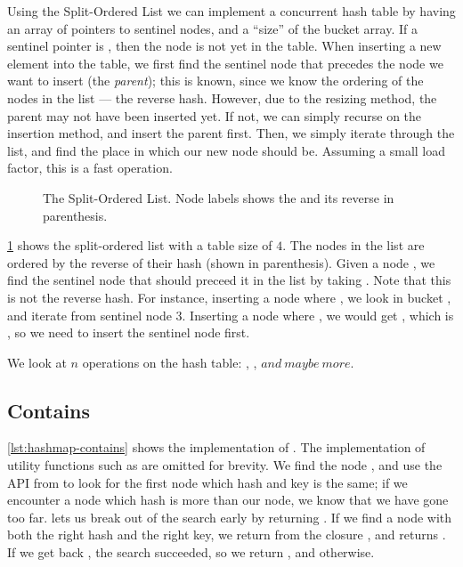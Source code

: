 Using the Split-Ordered List we can implement a concurrent hash table by having an array of
pointers to sentinel nodes, and a ``size'' of the bucket array. If a sentinel pointer is
, then the node is not yet in the table. When inserting a new element into the table, we
first find the sentinel node that precedes the node we want to insert (the \emph{parent}); this is
known, since we know the ordering of the nodes in the list --- the reverse hash. However, due to
the resizing method, the parent may not have been inserted yet. If not, we can simply recurse on
the insertion method, and insert the parent first. Then, we simply iterate through the list, and
find the place in which our new node should be. Assuming a small load factor, this is a fast
operation.

\begin{figure}[ht]
\centering

\caption{The Split-Ordered List. Node labels shows the  and its reverse in
parenthesis.\label{fig:split-order-list}}
\end{figure}

\cref{fig:split-order-list} shows the split-ordered list with a table size of $4$. The nodes in the
list are ordered by the reverse of their hash (shown in parenthesis). Given a node , we
find the sentinel node that should preceed it in the list by taking .
Note that this is not the reverse hash. For instance,
inserting a node where , we look in bucket , and iterate from
sentinel node 3.
Inserting a node where , we would get , which is ,
so we need to insert the sentinel node first.


We look at $n$ operations on the hash table: , , $and\ maybe\ more$.

\subsection{Contains}

\cref{lst:hashmap-contains} shows the implementation of . The
implementation of utility functions such as  are omitted for brevity.  We
find the  node , and use the  API from 
 to look for the first node which hash and key is the same; if we encounter a node
which hash is more than our node, we know that we have gone too far. 
lets us break out of the search early by returning  . If we find a node
with both the right hash and the right key, we return  from the
closure , and  returns . If we get back , the
search succeeded, so we return , and  otherwise.


